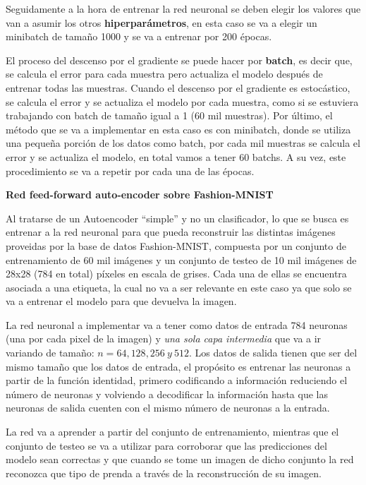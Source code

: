 \documentclass[12pt,a4paper]{article}
\begin{document}
\begin{multicols}{2}
Seguidamente a la hora de entrenar la red neuronal se deben elegir los valores que van a asumir los otros \textbf{hiperparámetros}, en esta caso se va a elegir un minibatch de tamaño 1000 y se va a entrenar por 200 épocas. 

El proceso del descenso por el gradiente se puede hacer por \textbf{batch}, es decir que, se calcula el error para cada muestra pero actualiza el modelo después de entrenar todas las muestras. Cuando el descenso por el gradiente es estocástico, se calcula el error y se actualiza el modelo por cada muestra, como si se estuviera trabajando con batch de tamaño igual a 1 (60 mil muestras). Por último, el método que se va a implementar en esta caso es con minibatch, donde se utiliza una pequeña porción de los datos como batch, por cada mil muestras se calcula el error y se actualiza el modelo, en total vamos a tener 60 batchs. A su vez, este procedimiento se va a repetir por cada una de las épocas. 

\begin{center}
\begin{large}
\textbf{Red feed-forward auto-encoder sobre Fashion-MNIST}
\end{large}
\end{center}

Al tratarse de un Autoencoder ``simple'' y no un clasificador, lo que se busca es entrenar a la red neuronal para que pueda reconstruir las distintas imágenes proveidas por la base de datos Fashion-MNIST, compuesta por un conjunto de entrenamiento de 60 mil imágenes y un conjunto de testeo de 10 mil imágenes de 28x28 (784 en total) píxeles en escala de grises. Cada una de ellas se encuentra asociada a una etiqueta, la cual no va a ser relevante en este caso ya que solo se va a entrenar el modelo para que devuelva la imagen.  

La red neuronal a implementar va a tener como datos de entrada 784 neuronas (una por cada pixel de la imagen) y \textit{una sola capa intermedia} que va a ir variando de tamaño: $n = 64, 128, 256 \ y \ 512$. Los datos de salida tienen que ser del mismo tamaño que los datos de entrada, el propósito es entrenar las neuronas a partir de la función identidad, primero codificando a información reduciendo el número de neuronas y volviendo a decodificar la información hasta que las neuronas de salida cuenten con el mismo número de neuronas a la entrada. 

La red va a aprender a partir del conjunto de entrenamiento, mientras que el conjunto de testeo se va a utilizar para corroborar que las predicciones del modelo sean correctas y que cuando se tome un imagen de dicho conjunto la red reconozca que tipo de prenda a través de la reconstrucción de su imagen.


\end{multicols}
\end{document}
